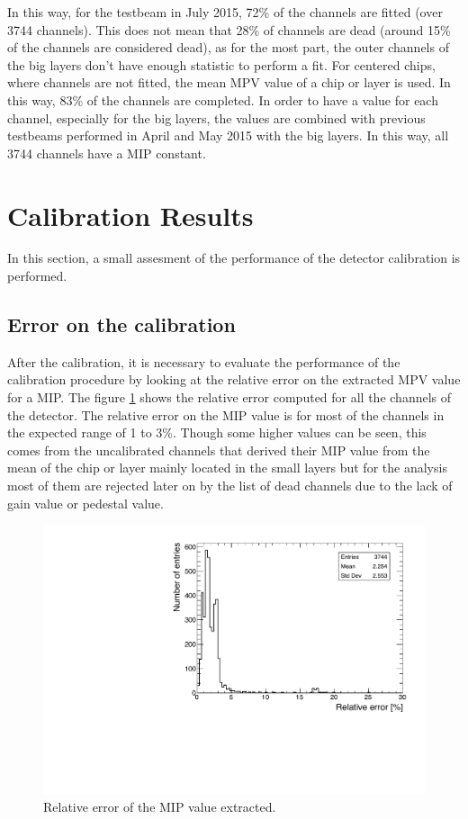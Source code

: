 In this way, for the testbeam in July 2015, 72\% of the channels are fitted (over 3744 channels). This does not mean that 28\% of channels are dead (around 15\% of the channels are considered dead), as for the most part, the outer channels of the big layers don't have enough statistic to perform a fit. For centered chips, where channels are not fitted, the mean MPV value of a chip or layer is used. In this way, 83\% of the channels are completed. In order to have a value for each channel, especially for the big layers, the values are combined with previous testbeams performed in April and May 2015 with the big layers. In this way, all 3744 channels have a MIP constant.

\section{Calibration Results}

In this section, a small assesment of the performance of the detector calibration is performed.

\subsection{Error on the calibration}

After the calibration, it is necessary to evaluate the performance of the calibration procedure by looking at the relative error on the extracted MPV value for a MIP. The figure \ref{fig:MIPError} shows the relative error computed for all the channels of the detector. The relative error on the MIP value is for most of the channels in the expected range of 1 to 3\%. Though some higher values can be seen, this comes from the uncalibrated channels that derived their MIP value from the mean of the chip or layer mainly located in the small layers but for the analysis most of them are rejected later on by the list of dead channels due to the lack of gain value or pedestal value.

\begin{figure}[htbp!]
	\centering
	\includegraphics[width=0.7\linewidth]{chap5/fig_EnergyCalib/RelativeErrorMIP_Combined.pdf}
	\caption{Relative error of the MIP value extracted.} \label{fig:MIPError}
\end{figure}

